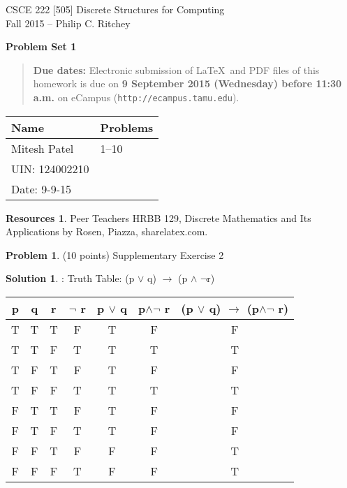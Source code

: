 \documentclass{article}
\theoremstyle{definition}
\newtheorem{problem}{Problem}
\newtheorem*{solution}{Solution}
\newtheorem*{resources}{Resources}
\newcommand{\names}[5]{
\begin{tabular}{|ll|}
\hline
\textbf{Name}  & \textbf{Problems}\\
\hline
#1 & 1--10\\
#2 & #3\\
#4 & #5\\
\hline
\end{tabular}}
\newcommand{\problemset}[1]{\begin{center}\textbf{Problem Set #1}\end{center}}
\newcommand{\duedate}[1]{\begin{quote}\textbf{Due dates:} Electronic
    submission of \LaTeX\ and PDF files of this homework is due on
    \textbf{#1} on eCampus (\texttt{http://ecampus.tamu.edu}). 
    \end{quote}}
\begin{document}
\begin{center}
{\large
CSCE 222 [505] Discrete Structures for Computing\\[.5ex]
Fall 2015 -- Philip C. Ritchey\\}
\end{center}

\problemset{1}

\duedate{9 September 2015 (Wednesday) before 11:30 a.m.}

\names{Mitesh Patel}
{UIN: 124002210}{}
{Date: 9-9-15}{}

\begin{resources} Peer Teachers HRBB 129, Discrete Mathematics and Its Applications by Rosen, Piazza, sharelatex.com.
\end{resources}

\bigskip

\newpage
\begin{problem} (10 points) 
Supplementary Exercise 2 
\end{problem}
\begin{solution}:
\newline
Truth Table:  (p $\vee$ q) $\to$ (p $\wedge$ $\neg $r)
\bigskip

\begin{center}
\begin{tabular}{ | c | c | c | c | c | c | c |} 
 \hline
 p & q & r & $\neg$ r & p $\vee$ q & p$\wedge$$\neg$ r & (p $\vee$ q) $\to$ (p$\wedge$$\neg$ r)\\
 \hline 
 T & T & T & F & T & F & F \\ 
 T & T & F & T & T & T & T \\ 
 T & F & T & F & T & F & F \\ 
 T & F & F & T & T & T & T \\ 
 F & T & T & F & T & F & F \\ 
 F & T & F & T & T & F & F \\ 
 F & F & T & F & F & F & T \\ 
 F & F & F & T & F & F & T \\ 
 \hline
\end{tabular}
\end{center}
\end{solution}

\newpage
\end{document}
